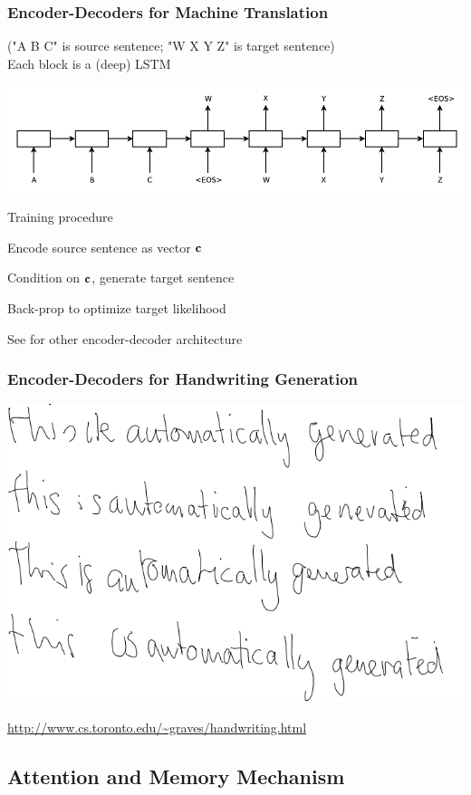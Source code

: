 \begin{frame}
\frametitle{Encoder-Decoders for Machine Translation \cite{sutskevar14sequence}}
\begin{scriptsize}("A B C" is source sentence; "W X Y Z" is target sentence)\\Each block is a (deep) LSTM\end{scriptsize}
\centerline{\includegraphics[scale=0.3]{figs/sutskevar14model}}
\bi
\item Training procedure
	\be
	\item Encode source sentence as vector $\bf{c}$
	\item Condition on $\bf{c}$, generate target sentence
	\item Back-prop to optimize target likelihood 
	\ee
\item See \cite{cho14phrase,kalchbrenner13} for other encoder-decoder architecture
\ei
\end{frame}

\begin{frame}
\frametitle{Encoder-Decoders for Handwriting Generation} 
\centerline{\includegraphics[scale=0.33]{figs/alexgraves_handwriting}}
\url{http://www.cs.toronto.edu/~graves/handwriting.html}
\end{frame}


\subsection[Attention/Memory]{Attention and Memory Mechanism}

